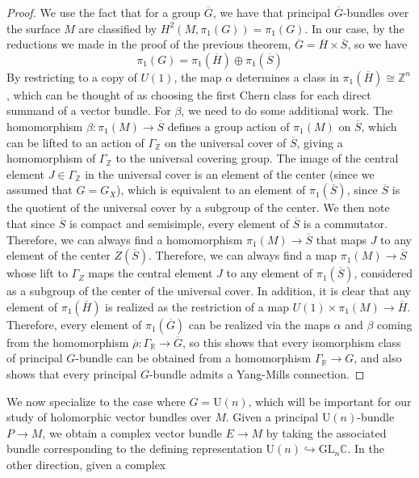 \documentclass[psamsfonts, 12pt]{amsart}
\theoremstyle{definition}
\theoremstyle{remark}
\newcommand{\R}{\mathbb{R}}
\newcommand{\Z}{\mathbb{Z}}
\newcommand{\C}{\mathbb{C}}
\newcommand{\GL}{\mathrm{GL}}
\begin{document}
\begin{proof}
We use the fact that for a group $\overline{G}$, we have that
principal $\overline{G}$-bundles over the surface $M$ are classified by
$H^2(M, \pi_1(G)) = \pi_1(G)$. In our case, by the reductions we made in the proof
of the previous theorem, $\overline{G} = \overline{H} \times \overline{S}$, so we have
\[
\pi_1(G) = \pi_1(\overline{H}) \oplus \pi_1(\overline{S})
\]
By restricting to a copy of $U(1)$, the map $\alpha$ determines
a class in $\pi_1(\overline{H}) \cong \Z^n$, which can be thought of as
choosing the first Chern class for each direct summand of a vector bundle.
For $\beta$, we need to do some additional work. The homomorphism
$\beta : \pi_1(M) \to \overline{S}$ defines a group action of $\pi_1(M)$ on
$\overline{S}$, which can be lifted to an action of $\Gamma_\Z$ on the universal
cover of $\overline{S}$, giving a homomorphism of $\Gamma_\Z$ to the universal covering
group. The image of the central element $J \in \Gamma_\Z$ in the
universal cover is an element of the center (since we assumed that $G = G_X$),
which is equivalent to an element of $\pi_1(\overline{S})$, since $\overline{S}$ is
the quotient of the universal cover by a subgroup of the center. We then note
that since $\overline{S}$ is compact and semisimple, every element of $\overline{S}$
is a commutator. Therefore, we can always find a homomorphism
$\pi_1(M) \to \overline{S}$ that maps $J$ to any element of the center
$Z(\overline{S})$. Therefore, we can always find a map $\pi_1(M) \to \overline{S}$
whose lift to $\Gamma_Z$ maps the central element $J$ to any element of
$\pi_1(\overline{S})$, considered as a subgroup of the center of the universal cover.
In addition, it is clear that any element of $\pi_1(\overline{H})$ is realized
as the restriction of a map $U(1) \times \pi_1(M) \to \overline{H}$. Therefore,
every element of $\pi_1(\overline{G})$ can be realized via the maps
$\alpha$ and $\beta$ coming from the homomorphism
$\overline{\rho} : \Gamma_\R \to \overline{G}$, so this shows that every
isomorphism class of principal $G$-bundle can be obtained from a homomorphism
$\Gamma_\R \to G$, and also shows that every principal $G$-bundle admits a Yang-Mills
connection.
\end{proof}
%
We now specialize to the case where $G = \mathrm{U}(n)$, which will be important for
our study of holomorphic vector bundles over $M$. Given a principal
$\mathrm{U}(n)$-bundle $P \to M$, we obtain a complex vector bundle $E \to M$ by
taking the associated bundle corresponding to the defining representation
$\mathrm{U}(n) \hookrightarrow \GL_n\C$. In the other direction, given a complex
\end{document}
